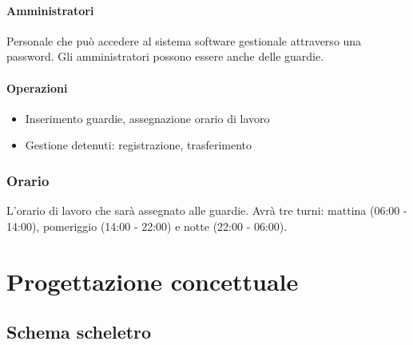 \documentclass[a4paper,12pt]{report}
\begin{document}
\subsubsection*{Amministratori}
Personale che può accedere al sistema software gestionale attraverso una password.
%
Gli amministratori possono essere anche delle guardie.
\subsubsection*{Operazioni}
\begin{itemize}
    \item Inserimento guardie, assegnazione orario di lavoro
    \item Gestione detenuti: registrazione, trasferimento
\end{itemize}
\subsection*{Orario}
L'orario di lavoro che sarà assegnato alle guardie.
%
Avrà tre turni: mattina (06:00 - 14:00), pomeriggio (14:00 - 22:00) e notte (22:00 - 06:00).
\chapter{Progettazione concettuale}
\section{Schema scheletro}

\end{document}
